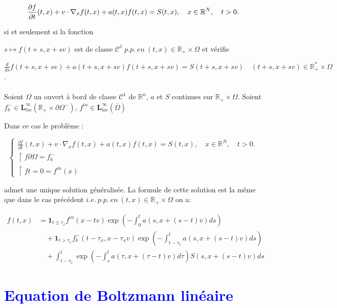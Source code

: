 \documentclass[onecolumn, 12pt, a4paper]{article}
\begin{document}
$$\frac{\partial f}{\partial t}(t,x)+v \cdot \nabla_x f(t,x)+ a(t,x)f(t,x)=S(t,x), \quad x \in \mathbb{R}^N, \quad t>0.\\$$

si et seulement si la fonction 

$s \mapsto f(t+s,x+sv)$ est de classe $\mathcal{C}^1 ~ p.p.~en~(t,x) \in \mathbb{R}_+ \times \Omega$ et vérifie

$\frac{d}{ds}f(t+s,x+sv) +a(t+s,x+sv)f(t+s,x+sv) = S(t+s,x+sv) \quad (t+s,x+sv) \in \mathbb{R}_+^* \times \Omega$.


\paragraph{}



Soient $\Omega$ un ouvert à bord de classe $\mathcal{C}^1$ de $\mathbb{R}^n$, $a$ et $S$ continues sur $\mathbb{R}_+ \times \Omega$. Soient  $f_b^- \in \mathbf{L}_{loc}^{\infty}(\mathbb{R}_+ \times \partial \Omega^-)$, $f^{in} \in \mathbf{L}_{loc}^{\infty}(\overline{\Omega})$

Dans ce cas le problème :

\[
\begin{cases}
\frac{\partial f}{\partial t}(t,x)+v \cdot \nabla_x f(t,x)+ a(t,x)f(t,x)=S(t,x), \quad x \in \mathbb{R}^N, \quad t>0.\\
\restriction{f}{\partial \Omega}= f_b^-\\
\restriction{f}{t=0}= f^{in}(x)
\end{cases}
\]

admet une unique solution généralisée. La formule de cette solution est la même que dans le cas précédent $i.e.~ p.p.~en~(t,x) \in \mathbb{R}_+ \times \Omega$ on a:

\[
\boxed{
\begin{aligned}
f(t,x) &= \mathbf{1}_{t \leq \tau_x} f^{in} (x-tv) \exp\left(-\int_0^t a(s,x+(s-t)v)ds\right) \\
&\quad + \mathbf{1}_{t > \tau_x} f_b^- (t-\tau_x,x-\tau_x v) \exp\left(-\int_{t-\tau_x}^t a(s,x+(s-t)v)ds\right) \\
&\quad + \int_{t-\tau_x}^t \exp\left(-\int_{s}^{t}a(\tau,x+(\tau-t)v)d\tau\right) S(s,x+(s-t)v)ds
\end{aligned}}
\]







\section{\textcolor{blue}{Equation de Boltzmann linéaire}}
\end{document}
